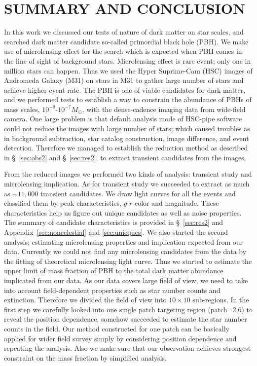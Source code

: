 \documentclass[iop, apj]{emulateapj}
\newcommand{\?}{\stackrel{?}{=}}
\begin{document}
\section{SUMMARY AND CONCLUSION}
\label{sec:dis2}
In this work 
we discussed our tests of nature of dark matter on star scales, and 
searched dark matter candidate so-called primordial black hole (PBH). 
We make use of microlensing effect for the search 
which is expected when PBH 
comes in the line of sight of background stars. 
Microlensing effect is rare event; only one in million stars can happen. 
Thus we used the Hyper Suprime-Cam (HSC) images of Andromeda Galaxy (M31) 
on stars in M31 to gather large number of stars and achieve higher event rate.  
The PBH is one of viable candidates for dark matter, and 
we performed tests to establish a way to constrain 
the abundance of PBHs of mass scales, $10^{-9}$-$10^{-7}M_\odot$, 
with the dense-cadence imaging data from wide-field camera.
One large problem is that 
default analysis mode of HSC-pipe software could not reduce the images with large number of stars; 
which caused troubles as in background subtraction, star catalog construction, 
image difference, and event detection. 
Therefore we managed to establish 
the reduction method as described in \S~\ref{sec:obs2} and \S~\ref{sec:res2}, to extract transient candidates from the images. 

From the reduced images we performed two kinds of analysis: 
transient study and microlensing implication. 
As for transient study we succeeded to extract as much as $\sim11,000$ transient candidates. 
We draw light curves for all the events and classified them 
by peak characteristics, $g$-$r$ color and magnitude. 
These characteristics help us figure out unique candidates  
as well as noise properties. 
The summary of candidate characteristics is provided 
in \S~\ref{sec:res2} and Appendix~\ref{sec:noncelestial} and \ref{sec:unieques}. 
We also started the second analysis; estimating microlensing properties and implication expected from our data.
Currently we could not find any microlensing candidates from the data 
by the fitting of theoretical microlensing light curve. 
Thus we started to estimate the upper limit of mass fraction of PBH to the total dark matter abundance implicated from our data. 
As our data covers large field of view, we need to take into account field-dependent properties 
such as star number counts and extinction. 
Therefore we divided the field of view into $10\times10$ sub-regions.  
In the first step we carefully looked into one single 
patch targeting region (patch=2,6) to reveal the position dependence, 
somehow succeeded to estimate the star number counts in the field.   
Our method constructed for one patch can be basically applied for wider field survey 
simply by considering position dependence and repeating the analysis. 
Also we make sure that our observation achieves 
strongest constraint on the mass fraction by simplified analysis. 
\end{document}
